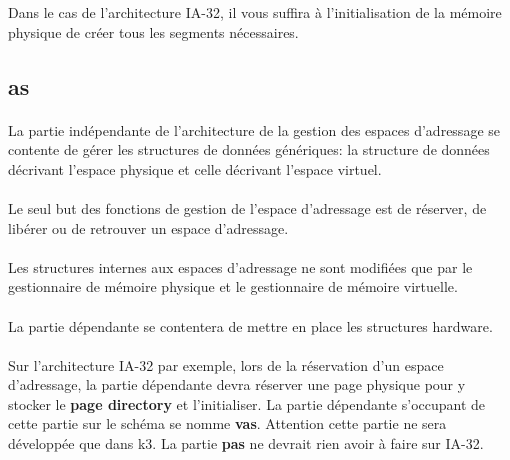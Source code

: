 \documentclass[10pt,a4wide]{article}
\begin{document}
Dans le cas de l'architecture IA-32, il vous suffira \`a l'initialisation de la
m\'emoire physique de cr\'eer tous les segments n\'ecessaires.

\subsection{as}

\paragraph{}

La partie ind\'ependante de l'architecture de la gestion des espaces
d'adressage se contente de g\'erer les structures de donn\'ees
g\'en\'eriques: la structure de donn\'ees d\'ecrivant l'espace physique
et celle d\'ecrivant l'espace virtuel.

\paragraph{}

Le seul but des fonctions de gestion de l'espace d'adressage est de
r\'eserver, de lib\'erer ou de retrouver un espace d'adressage.

\paragraph{}

Les structures internes aux espaces d'adressage ne sont modifi\'ees que
par le gestionnaire de m\'emoire physique et le gestionnaire de m\'emoire
virtuelle.

\paragraph{}

La partie d\'ependante se contentera de mettre en place les structures
hardware.

\paragraph{}

Sur l'architecture IA-32 par exemple, lors de la r\'eservation
d'un espace d'adressage, la partie d\'ependante devra r\'eserver une page
physique pour y stocker le \textbf{page directory} et l'initialiser. La
partie d\'ependante s'occupant de cette partie sur le sch\'ema se nomme
\textbf{vas}. Attention cette partie ne sera d\'evelopp\'ee que dans k3.
La partie \textbf{pas} ne devrait rien avoir \`a faire sur IA-32.
\end{document}
